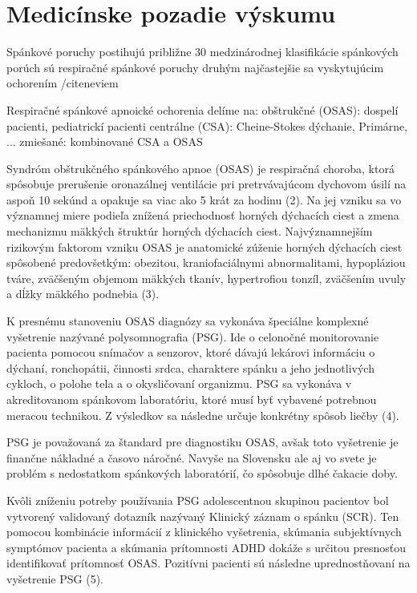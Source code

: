 
\chapter{Medicínske pozadie výskumu} \label{kap:Motivacia}

\pagestyle{fancy}
\fancyhf{}
\fancyfoot[CE,CO]{\thepage}

Spánkové poruchy postihujú približne 30%
medzinárodnej klasifikácie spánkových porúch sú respiračné spánkové poruchy druhým
najčastejšie sa vyskytujúcim ochorením /cite{neviem}

Respiračné spánkové apnoické ochorenia delíme na:
obštrukčné (OSAS): dospelí pacienti, pediatrickí pacienti
centrálne (CSA): Cheine-Stokes dýchanie, Primárne, ...
zmiešané: kombinované CSA a OSAS

Syndróm obštrukčného spánkového apnoe (OSAS) je respiračná choroba, ktorá spôsobuje
prerušenie oronazálnej ventilácie pri pretrvávajúcom dychovom úsilí na aspoň 10 sekúnd a
opakuje sa viac ako 5 krát za hodinu (2). Na jej vzniku sa vo významnej miere podieľa znížená
priechodnosť horných dýchacích ciest a zmena mechanizmu mäkkých štruktúr horných dýchacích
ciest. Najvýznamnejším rizikovým faktorom vzniku OSAS je anatomické zúženie horných
dýchacích ciest spôsobené predovšetkým: obezitou, kraniofaciálnymi abnormalitami, hypopláziou
tváre, zväčšeným objemom mäkkých tkanív, hypertrofiou tonzíl, zväčšením uvuly a dĺžky
mäkkého podnebia (3).

K presnému stanoveniu OSAS diagnózy sa vykonáva špeciálne komplexné vyšetrenie nazývané
polysomnografia (PSG). Ide o celonočné monitorovanie pacienta pomocou snímačov a senzorov,
ktoré dávajú lekárovi informáciu o dýchaní, ronchopátii, činnosti srdca, charaktere spánku a jeho
jednotlivých cykloch, o polohe tela a o okysličovaní organizmu. PSG sa vykonáva v
akreditovanom spánkovom laboratóriu, ktoré musí byť vybavené potrebnou meracou technikou. Z
výsledkov sa následne určuje konkrétny spôsob liečby (4).

PSG je považovaná za štandard pre diagnostiku OSAS, avšak toto vyšetrenie je finančne
nákladné a časovo náročné. Navyše na Slovensku ale aj vo svete je problém s nedostatkom
spánkových laboratórií, čo spôsobuje dlhé čakacie doby.

Kvôli zníženiu potreby používania PSG adolescentnou skupinou pacientov bol vytvorený
validovaný dotazník nazývaný Klinický záznam o spánku (SCR). Ten pomocou kombinácie
informácií z klinického vyšetrenia, skúmania subjektívnych symptómov pacienta a skúmania
prítomnosti ADHD dokáže s určitou presnosťou identifikovať prítomnosť OSAS. Pozitívni
pacienti sú následne uprednostňovaní na vyšetrenie PSG (5).

